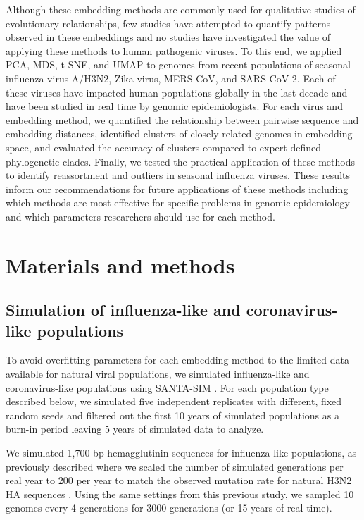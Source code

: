 \documentclass[10pt,letterpaper]{article}
\begin{document}
Although these embedding methods are commonly used for qualitative studies of evolutionary relationships, few studies have attempted to quantify patterns observed in these embeddings and no studies have investigated the value of applying these methods to human pathogenic viruses.
To this end, we applied PCA, MDS, t-SNE, and UMAP to genomes from recent populations of seasonal influenza virus A/H3N2, Zika virus, MERS-CoV, and SARS-CoV-2.
Each of these viruses have impacted human populations globally in the last decade and have been studied in real time by genomic epidemiologists.
For each virus and embedding method, we quantified the relationship between pairwise sequence and embedding distances, identified clusters of closely-related genomes in embedding space, and evaluated the accuracy of clusters compared to expert-defined phylogenetic clades.
Finally, we tested the practical application of these methods to identify reassortment and outliers in seasonal influenza viruses.
These results inform our recommendations for future applications of these methods including which methods are most effective for specific problems in genomic epidemiology and which parameters researchers should use for each method.

\section*{Materials and methods}

\subsection*{Simulation of influenza-like and coronavirus-like populations}

To avoid overfitting parameters for each embedding method to the limited data available for natural viral populations, we simulated influenza-like and coronavirus-like populations using SANTA-SIM \cite{Jariani2019}.
For each population type described below, we simulated five independent replicates with different, fixed random seeds and filtered out the first 10 years of simulated populations as a burn-in period leaving 5 years of simulated data to analyze.

We simulated 1,700 bp hemagglutinin sequences for influenza-like populations, as previously described where we scaled the number of simulated generations per real year to 200 per year to match the observed mutation rate for natural H3N2 HA sequences \cite{Huddleston2020}.
Using the same settings from this previous study, we sampled 10 genomes every 4 generations for 3000 generations (or 15 years of real time).
\end{document}
